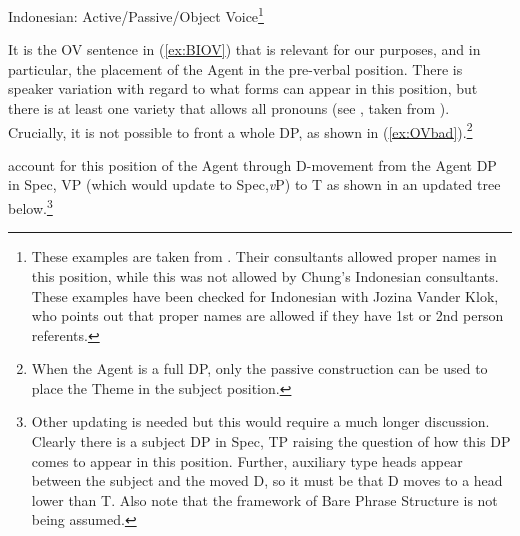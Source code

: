 \documentclass[output=paper,colorlinks,citecolor=brown,
]{langscibook}
\begin{document}
\ea Indonesian: Active/Passive/Object Voice\footnote{These examples are taken from \citet{Guilfoyle:1992}.  Their consultants allowed proper names in this position, while this was not allowed by Chung's Indonesian consultants.  These examples have been checked for Indonesian with Jozina Vander Klok, who points out that proper names are allowed if they have 1st or 2nd person referents.}
    \z
\z

It is the OV sentence in (\ref{ex:BIOV})  that is relevant for our purposes, and in particular, the placement of the Agent in the pre-verbal position.   There is speaker variation with regard to what forms can appear in this position, but there is at least one variety that allows all pronouns (see \citealt[60–61]{Chung:1976a}, taken from  \citealt[235]{Macdonald:1967}).  Crucially, it is not possible to front a whole DP, as shown in (\ref{ex:OVbad}).\footnote{When the Agent is a full DP, only the passive construction can be used to place the Theme in the subject position.} 

\citet{Guilfoyle:1992} account for this position of the Agent through D-move\-ment from the Agent DP in Spec, VP (which would update to Spec,\textit{v}P) to T as shown in an updated tree below.\footnote{Other updating is needed but this would require a much longer discussion.  Clearly there is a subject DP in Spec, TP raising the question of how this DP comes to appear in this position.  Further, auxiliary type heads appear between the subject and the moved D, so it must be that D  moves to a head lower than T. Also note that the framework of Bare Phrase Structure is not being assumed.} 
\end{document}
